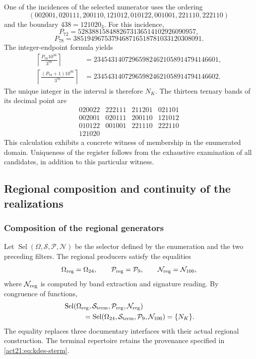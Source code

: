 One of the incidences of the selected numerator uses the ordering
\[
 (002001,020111,200110,121012,010122,001001,221110,222110)
\]
and the boundary $438=121020_3$. For this incidence,
\[
 P_{72}=5283881584882673136514102926090957,
\]
\[
 P_{78}=3851949675379468716518781033120308091.
\]
The integer-endpoint formula yields
\begin{align*}
 \left\lceil\frac{P_{78}10^{36}}{3^{78}}\right\rceil
 &=234543140729659824621058914794146601,\\
 \left\lceil\frac{(P_{78}+1)10^{36}}{3^{78}}\right\rceil
 &=234543140729659824621058914794146602.
\end{align*}
The unique integer in the interval is therefore $N_K$. The thirteen ternary
bands of its decimal point are
\[
 \begin{array}{rrrr}
 020022&222111&211201&021101\\
 002001&020111&200110&121012\\
 010122&001001&221110&222110\\
 121020&&&
 \end{array}
\]
This calculation exhibits a concrete witness of membership in the enumerated
domain. Uniqueness of the register follows from the exhaustive examination of
all candidates, in addition to this particular witness.

\subsection{Regional composition and continuity of the realizations}

\subsubsection{Composition of the regional generators}

Let $\operatorname{Sel}(\Omega,\mathcal S,\mathcal P,\mathcal N)$ be the
selector defined by the enumeration and the two preceding filters.
The regional producers satisfy the equalities
\[
 \Omega_{\rm reg}=\Omega_{24},\qquad
 \mathcal P_{\rm reg}=\mathcal P_9,\qquad
 \mathcal N_{\rm reg}=\mathcal N_{100},
\]
where $\mathcal N_{\rm reg}$ is computed by band extraction and
signature reading. By congruence of functions,
\begin{equation}
 \begin{split}
 &\operatorname{Sel}(\Omega_{\rm reg},\mathcal S_{\rm term},
                    \mathcal P_{\rm reg},\mathcal N_{\rm reg})\\
 &\hspace{10mm}=
 \operatorname{Sel}(\Omega_{24},\mathcal S_{\rm term},
                    \mathcal P_9,\mathcal N_{100})=\{N_K\}.
 \end{split}
 \label{act21:eq:kdes-composicion}
\end{equation}
The equality replaces three documentary interfaces with their actual
regional construction. The terminal repertoire retains the provenance
specified in \eqref{act21:eq:kdes-sterm}.

